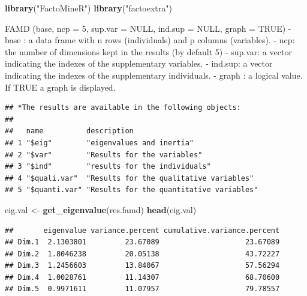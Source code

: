 \documentclass[
]{article}
\newenvironment{Shaded}{\begin{snugshade}}{\end{snugshade}}
\newcommand{\DataTypeTok}[1]{\textcolor[rgb]{0.13,0.29,0.53}{#1}}
\newcommand{\DecValTok}[1]{\textcolor[rgb]{0.00,0.00,0.81}{#1}}
\newcommand{\KeywordTok}[1]{\textcolor[rgb]{0.13,0.29,0.53}{\textbf{#1}}}
\newcommand{\NormalTok}[1]{#1}
\newcommand{\OperatorTok}[1]{\textcolor[rgb]{0.81,0.36,0.00}{\textbf{#1}}}
\newcommand{\StringTok}[1]{\textcolor[rgb]{0.31,0.60,0.02}{#1}}
\begin{document}
\begin{Shaded}
\begin{Highlighting}[]
\KeywordTok{library}\NormalTok{(}\StringTok{"FactoMineR"}\NormalTok{)}
\KeywordTok{library}\NormalTok{(}\StringTok{"factoextra"}\NormalTok{)}
\end{Highlighting}
\end{Shaded}

FAMD (base, ncp = 5, sup.var = NULL, ind.sup = NULL, graph = TRUE) -
base : a data frame with n rows (individuals) and p columns (variables).
- ncp: the number of dimensions kept in the results (by default 5) -
sup.var: a vector indicating the indexes of the supplementary variables.
- ind.sup: a vector indicating the indexes of the supplementary
individuals. - graph : a logical value. If TRUE a graph is displayed.

\begin{Shaded}
\end{Shaded}

\begin{verbatim}
## *The results are available in the following objects:
## 
##   name          description                             
## 1 "$eig"        "eigenvalues and inertia"               
## 2 "$var"        "Results for the variables"             
## 3 "$ind"        "results for the individuals"           
## 4 "$quali.var"  "Results for the qualitative variables" 
## 5 "$quanti.var" "Results for the quantitative variables"
\end{verbatim}

\begin{Shaded}
\begin{Highlighting}[]
\NormalTok{eig.val <-}\StringTok{ }\KeywordTok{get_eigenvalue}\NormalTok{(res.famd)}
\KeywordTok{head}\NormalTok{(eig.val)}
\end{Highlighting}
\end{Shaded}

\begin{verbatim}
##       eigenvalue variance.percent cumulative.variance.percent
## Dim.1  2.1303801         23.67089                    23.67089
## Dim.2  1.8046238         20.05138                    43.72227
## Dim.3  1.2456603         13.84067                    57.56294
## Dim.4  1.0028761         11.14307                    68.70600
## Dim.5  0.9971611         11.07957                    79.78557
\end{verbatim}
\end{document}
